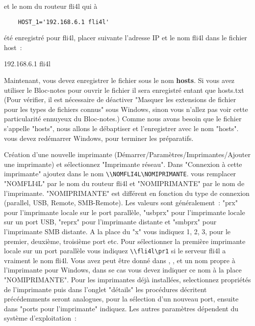 \begin{enumerate}
    et le nom du routeur fli4l qui à

\begin{example}
\begin{verbatim}
    HOST_1='192.168.6.1 fli4l'
\end{verbatim}
\end{example}

    été enregistré pour fli4l, placer suivante l'adresse IP et le nom fli4l
    dans le fichier host~:

    192.168.6.1     fli4l

    Maintenant, vous devez enregistrer le fichier sous le nom \textbf{hosts}. Si vous
    avez utiliser le Bloc-notes pour ouvrir le fichier il sera enregistré entant
    que hosts.txt (Pour vérifier, il est nécessaire de déactiver "Masquer
    les extensions de fichier pour les types de fichiers connus" sous Windows,
    sinon vous n'allez pas voir cette particularité ennuyeux du Bloc-notes.) Comme
    nous avons besoin que le fichier s'appelle "hosts", nous allons le débaptiser
    et l'enregistrer avec le nom "hosts". vous devez redémarrer Windows, pour
    terminer les préparatifs.

    Création d'une nouvelle imprimante (Démarrer/Paramètres/Imprimantes/Ajouter
    une imprimante) et sélectionnez "Imprimante réseau". Dans "Connexion à cette
    imprimante" ajoutez dans le nom \verb+\\NOMFLI4L\NOMIPRIMANTE+. vous remplacer
    "NOMFLI4L" par le nom du routeur fli4l et "NOMIPRIMANTE" par le nom de l'imprimante.
     "NOMIPRIMANTE" est différent en fonction du type de connexion (parallel, USB,
     Remote, SMB-Remote). Les valeurs sont généralement~:
    "prx" pour l'imprimante locale sur le port parallèle, "usbprx" pour l'imprimante locale
    sur un port USB, "reprx" pour l'imprimante distante et "smbprx" pour l'imprimante
    SMB distante. A la place du "x" vous indiquez 1, 2, 3, pour le premier, deuxième,
    troisième port etc. Pour sélectionner la première imprimante locale sur un
    port parallèle vous indiquez \verb+\\fli4l\pr1+ si le serveur fli4l a vraiment
    le nom fli4l. Vous avez peut être donné dans ,
    , 
    et  un nom propre à l'imprimante
    pour Windows, dans se cas vous devez indiquer ce nom à la place "NOMIPRIMANTE".
    Pour les imprimantes déjà installées, selectionnez propriétés de l'imprimante
    puis dans l'onglet "détails" les procédures décritent précédemments seront
    analogues, pour la sélection d'un nouveau port, ensuite dans "ports pour
    l'imprimante" indiquez. Les autres paramètres dépendent du système
    d'exploitation~:


\end{enumerate}
